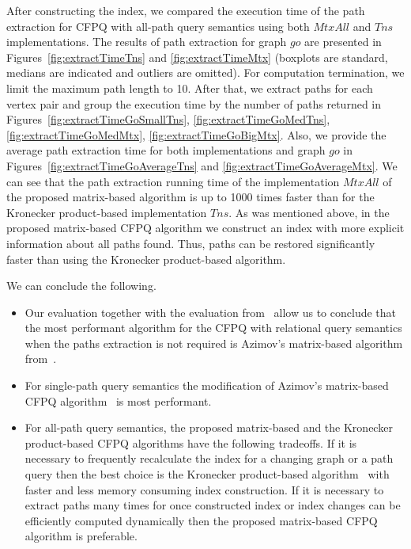 After constructing the index, we compared the execution time of the path extraction for CFPQ with all-path query semantics using both $MtxAll$ and $Tns$ implementations. The results of path extraction for graph $go$ are presented in Figures~\ref{fig:extractTimeTns} and \ref{fig:extractTimeMtx} (boxplots are standard, medians are indicated and outliers are omitted). For computation termination, we limit the maximum path length to 10. After that, we extract paths for each vertex pair and group the execution time by the number of paths returned in Figures~\ref{fig:extractTimeGoSmallTns}, \ref{fig:extractTimeGoMedTns}, \ref{fig:extractTimeGoMedMtx}, \ref{fig:extractTimeGoBigMtx}. Also, we provide the average path extraction time for both implementations and graph $go$ in Figures~\ref{fig:extractTimeGoAverageTns} and \ref{fig:extractTimeGoAverageMtx}. We can see that the path extraction running time of the implementation $MtxAll$ of the proposed matrix-based algorithm is up to 1000 times faster than for the Kronecker product-based implementation $Tns$. As was mentioned above, in the proposed matrix-based CFPQ algorithm we construct an index with more explicit information about all paths found. Thus, paths can be restored significantly faster than using the Kronecker product-based algorithm.

We can conclude the following.
\begin{itemize}
	\item Our evaluation together with the evaluation from~\cite{10.1145/3398682.3399163, kron} allow us to conclude that the most performant algorithm for the CFPQ with relational query semantics when the paths extraction is not required is Azimov's matrix-based algorithm from~\cite{Azimov:2018:CPQ:3210259.3210264}.
	\item For single-path query semantics the modification of Azimov's matrix-based CFPQ algorithm~\cite{10.1145/3398682.3399163} is most performant.
	\item For all-path query semantics, the proposed matrix-based and the Kronecker product-based CFPQ algorithms have the following tradeoffs. If it is necessary to frequently recalculate the index for a changing graph or a path query then the best choice is the Kronecker product-based algorithm~\cite{kron} with faster and less memory consuming index construction. If it is necessary to extract paths many times for once constructed index or index changes can be efficiently computed dynamically then the proposed matrix-based CFPQ algorithm is preferable.
\end{itemize}




